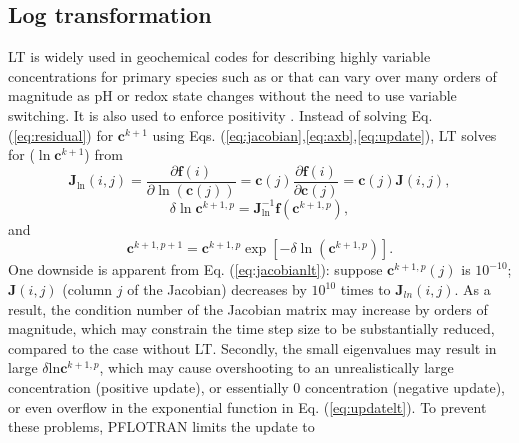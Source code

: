 \documentclass[gmd, manuscript]{copernicus}
\begin{document}
\subsection{Log transformation}
LT is widely used in geochemical codes for describing highly variable
concentrations for primary species such as  or  that can
vary over many orders of magnitude as pH or redox state changes without the
need to use variable switching. It is also used to enforce positivity
\citep{Bethke2007,Hammond2003,Parkhurst1999}. Instead of solving Eq.
(\ref{eq:residual}) for $\mathbf{c}^{k+1}$ using Eqs.
(\ref{eq:jacobian},\ref{eq:axb},\ref{eq:update}), LT solves for
($\ln\mathbf{c}^{k+1}$) from
\begin{equation}
\mathbf{J}_{\ln}(i,j)=\frac{\partial \mathbf{f}(i)}{\partial
\ln(\mathbf{c}(j))} = \mathbf{c}(j) \frac{\partial
\mathbf{f}(i)}{\partial \mathbf{c}(j)} = \mathbf{c}(j) \mathbf{J}(i,j),
\label{eq:jacobianlt}
\end{equation}
\begin{equation}
\delta \ln\mathbf{c}^{k+1,p}= \mathbf{J}^{-1}_{\ln} \mathbf{f} (\mathbf{c}^{k+1,p}),
\label{eq:axblt}
\end{equation}
and
\begin{equation}
\mathbf{c}^{k+1,p+1}=\mathbf{c}^{k+1,p}\exp[-\delta
\ln(\mathbf{c}^{k+1,p})].
\label{eq:updatelt}	
\end{equation}
One downside is apparent from Eq. (\ref{eq:jacobianlt}): suppose
$\mathbf{c}^{k+1,p}(j)$ is $10^{-10}$; $\mathbf{J}(i,j)$ (column $j$ of the
Jacobian) decreases by $10^{10}$ times to $\mathbf{J}_{ln}(i,j)$. As a result,
the condition number of the Jacobian matrix may increase by orders of
magnitude, which may constrain the time step size to be substantially reduced,
compared to the case without LT.  Secondly, the small
eigenvalues may result in large $\delta \text{ln} \mathbf{c}^{k+1,p}$, which
may cause overshooting to an unrealistically large concentration (positive update), or
essentially 0 concentration (negative update), or even overflow in the
exponential function in Eq. (\ref{eq:updatelt}).  To prevent these problems,
PFLOTRAN limits the update to 
\end{document}
